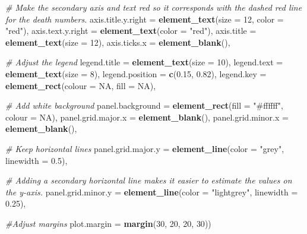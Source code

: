 \documentclass[
]{article}
\newenvironment{Shaded}{\begin{snugshade}}{\end{snugshade}}
\newcommand{\AttributeTok}[1]{\textcolor[rgb]{0.13,0.29,0.53}{#1}}
\newcommand{\CommentTok}[1]{\textcolor[rgb]{0.56,0.35,0.01}{\textit{#1}}}
\newcommand{\ConstantTok}[1]{\textcolor[rgb]{0.56,0.35,0.01}{#1}}
\newcommand{\DecValTok}[1]{\textcolor[rgb]{0.00,0.00,0.81}{#1}}
\newcommand{\FloatTok}[1]{\textcolor[rgb]{0.00,0.00,0.81}{#1}}
\newcommand{\FunctionTok}[1]{\textcolor[rgb]{0.13,0.29,0.53}{\textbf{#1}}}
\newcommand{\NormalTok}[1]{#1}
\newcommand{\StringTok}[1]{\textcolor[rgb]{0.31,0.60,0.02}{#1}}
\begin{document}
\begin{Shaded}
\begin{Highlighting}[]
    
  \CommentTok{\# Make the secondary axis and text red so it corresponds with the dashed red line for the death numbers. }
    \AttributeTok{axis.title.y.right =} \FunctionTok{element\_text}\NormalTok{(}\AttributeTok{size =} \DecValTok{12}\NormalTok{, }\AttributeTok{color =} \StringTok{"red"}\NormalTok{),  }
    \AttributeTok{axis.text.y.right =} \FunctionTok{element\_text}\NormalTok{(}\AttributeTok{color =} \StringTok{"red"}\NormalTok{),}
    \AttributeTok{axis.title =} \FunctionTok{element\_text}\NormalTok{(}\AttributeTok{size =} \DecValTok{12}\NormalTok{),}
    \AttributeTok{axis.ticks.x =} \FunctionTok{element\_blank}\NormalTok{(),}
    
  \CommentTok{\# Adjust the legend}
    \AttributeTok{legend.title =} \FunctionTok{element\_text}\NormalTok{(}\AttributeTok{size =} \DecValTok{10}\NormalTok{),}
    \AttributeTok{legend.text =} \FunctionTok{element\_text}\NormalTok{(}\AttributeTok{size =} \DecValTok{8}\NormalTok{),}
    \AttributeTok{legend.position =} \FunctionTok{c}\NormalTok{(}\FloatTok{0.15}\NormalTok{, }\FloatTok{0.82}\NormalTok{),}
    \AttributeTok{legend.key =} \FunctionTok{element\_rect}\NormalTok{(}\AttributeTok{colour =} \ConstantTok{NA}\NormalTok{, }\AttributeTok{fill =} \ConstantTok{NA}\NormalTok{),}
    
    
 \CommentTok{\# Add white background}
    \AttributeTok{panel.background =} \FunctionTok{element\_rect}\NormalTok{(}\AttributeTok{fill =} \StringTok{"\#ffffff"}\NormalTok{, }\AttributeTok{colour =} \ConstantTok{NA}\NormalTok{),}
    \AttributeTok{panel.grid.major.x =} \FunctionTok{element\_blank}\NormalTok{(),}
    \AttributeTok{panel.grid.minor.x =} \FunctionTok{element\_blank}\NormalTok{(),}
   
  \CommentTok{\# Keep horizontal lines}
    \AttributeTok{panel.grid.major.y =} \FunctionTok{element\_line}\NormalTok{(}\AttributeTok{color =} \StringTok{"grey"}\NormalTok{, }\AttributeTok{linewidth =} \FloatTok{0.5}\NormalTok{),}
    
  \CommentTok{\# Adding a secondary horizontal line makes it easier to estimate the values on the y{-}axis. }
    \AttributeTok{panel.grid.minor.y =} \FunctionTok{element\_line}\NormalTok{(}\AttributeTok{color =} \StringTok{"lightgrey"}\NormalTok{, }\AttributeTok{linewidth =} \FloatTok{0.25}\NormalTok{),}
    
  \CommentTok{\#Adjust margins}
    \AttributeTok{plot.margin =} \FunctionTok{margin}\NormalTok{(}\DecValTok{30}\NormalTok{, }\DecValTok{20}\NormalTok{, }\DecValTok{20}\NormalTok{, }\DecValTok{30}\NormalTok{))}
\end{Highlighting}
\end{Shaded}
\end{document}
